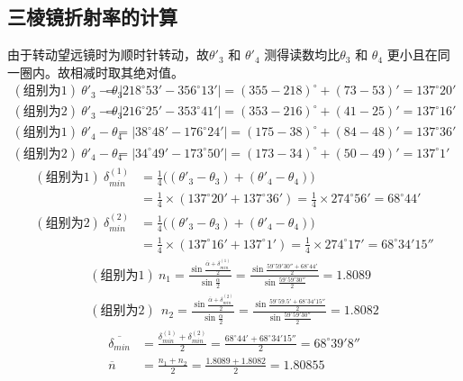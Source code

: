 \documentclass[UTF8]{ctexart}
\begin{document}
\subsection{三棱镜折射率的计算}
由于转动望远镜时为顺时针转动，故$\theta'_3$ 和 $\theta'_4$ 测得读数均比$\theta_3$ 和 $\theta_4$ 更小且在同一圈内。故相减时取其绝对值。
\begin{align*}
    (\text{组别为1}) \ \theta'_3 - \theta_3 &= | 218^{\circ}53' - 356^{\circ}13'| = (355 - 218)^{\circ} + (73 - 53)' = 137^{\circ}20' \\
    (\text{组别为2}) \ \theta'_3 - \theta_3 &= | 216^{\circ}25' - 353^{\circ}41'| = (353 - 216)^{\circ} + (41 - 25)' = 137^{\circ}16' 
\end{align*}
\begin{align*}
    (\text{组别为1}) \ \theta'_4 - \theta_4 &= | 38^{\circ}48' - 176^{\circ}24'| = (175 - 38)^{\circ} + (84 - 48)' = 137^{\circ}36' \\
    (\text{组别为2}) \ \theta'_4 - \theta_4 &= | 34^{\circ}49' - 173^{\circ}50'| = (173 - 34)^{\circ} + (50 - 49)' = 137^{\circ}1' 
\end{align*}
\begin{align*}
    (\text{组别为1}) \ \delta_{min}^{(1)} &=  \frac{1}{4} \big( (\theta'_3 - \theta_3 ) + (\theta'_4 - \theta_4) \big)\\
    &= \frac{1}{4} \times (137^{\circ}20' + 137^{\circ}36') = \frac{1}{4} \times 274^{\circ}56' = 68^{\circ}44' \\
    (\text{组别为2}) \ \delta_{min}^{(2)} &=  \frac{1}{4} \big( (\theta'_3 - \theta_3 ) + (\theta'_4 - \theta_4) \big)\\
    &= \frac{1}{4} \times (137^{\circ}16' + 137^{\circ}1') = \frac{1}{4} \times 274^{\circ}17' = 68^{\circ}34'15'' 
\end{align*}
\begin{align*}
    (\text{组别为1}) \ n_1  = \frac{\sin \frac{  \overline{\alpha} + \delta_{min}^{(1)}}{2}}{\sin \frac{\overline{\alpha}}{2}}  = 
    \frac{\sin \frac{  59^{\circ}59'30'' +  68^{\circ}44'}{2}}{\sin \frac{59^{\circ}59'30''}{2}} =  1.8089 \\
    (\text{组别为2}) \ \ n_2  = \frac{\sin \frac{\overline{\alpha} + \delta_{min}^{(2)}}{2}}{\sin \frac{\overline{\alpha}}{2}} = \frac{\sin \frac{  59^{\circ}59.5' +  68^{\circ}34'15''}{2}}{\sin \frac{59^{\circ}59'30''}{2}} = 1.8082 
\end{align*}
\begin{align*}
 \overline{\delta_{min}} &= \frac{\delta_{min}^{(1)} + \delta_{min}^{(2)}}{2} = \frac{68^{\circ}44' + 68^{\circ}34'15'' }{2} = 68^{\circ}39'8'' \\
    \overline{n} &= \frac{n_1 + n_2}{2} =   \frac{1.8089 + 1.8082}{2} = 1.80855
\end{align*}
\end{document}
